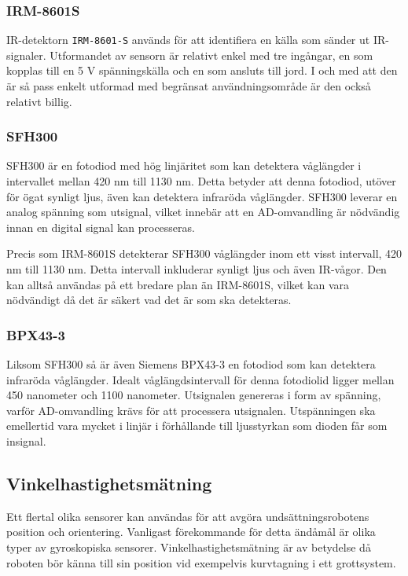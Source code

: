\documentclass[11pt]{article}
\begin{document}
\begin{flushleft}
\subsubsection{IRM-8601S} %
IR-detektorn \verb+IRM-8601-S+ används för att identifiera en källa som sänder ut IR-signaler. Utformandet av sensorn är relativt enkel med tre ingångar, en som kopplas till en 5 V spänningskälla och en som ansluts till jord. I och med att den är så pass enkelt utformad med begränsat användningsområde är den också relativt billig. \cite{IRM}

\subsubsection{SFH300} %
SFH300 är en fotodiod med hög linjäritet som kan detektera våglängder i intervallet mellan 420 nm till 1130 nm. Detta betyder att denna fotodiod, utöver för ögat synligt ljus, även kan detektera infraröda våglängder. SFH300 leverar en analog spänning som utsignal, vilket innebär att en AD-omvandling är nödvändig innan en digital signal kan processeras. \cite{Osram}

Precis som IRM-8601S detekterar SFH300 våglängder inom ett visst intervall, 420 nm till 1130 nm. Detta intervall inkluderar synligt ljus och även IR-vågor. Den kan alltså användas på ett bredare plan än IRM-8601S, vilket kan vara nödvändigt då det är säkert vad det är som ska detekteras. \cite{Osram}

\subsubsection{BPX43-3}
Liksom SFH300 så är även Siemens BPX43-3 en fotodiod som kan detektera infraröda våglängder. Idealt våglängdsintervall för denna fotodiolid ligger mellan 450 nanometer och 1100 nanometer. Utsignalen genereras i form av spänning, varför AD-omvandling krävs för att processera utsignalen. Utspänningen ska emellertid vara mycket i linjär i förhållande till ljusstyrkan som dioden får som insignal. \cite{siemens}

\subsection{Vinkelhastighetsmätning}
Ett flertal olika sensorer kan användas för att avgöra undsättningsrobotens position och orientering. Vanligast förekommande för detta ändåmål är olika typer av gyroskopiska sensorer. Vinkelhastighetsmätning är av betydelse då roboten bör känna till sin position vid exempelvis kurvtagning i ett grottsystem.


\end{flushleft}
\end{document}
